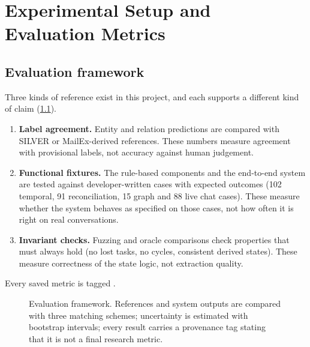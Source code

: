 \chapter{Experimental Setup and Evaluation Metrics}
\label{ch:evalsetup}

\section{Evaluation framework}
Three kinds of reference exist in this project, and each supports a different kind of claim (\cref{fig:evalframework}).
\begin{enumerate}
  \item \textbf{Label agreement.} Entity and relation predictions are compared with SILVER or MailEx-derived references. These numbers measure agreement with provisional labels, not accuracy against human judgement.
  \item \textbf{Functional fixtures.} The rule-based components and the end-to-end system are tested against developer-written cases with expected outcomes (102 temporal, 91 reconciliation, 15 graph and 88 live chat cases). These measure whether the system behaves as specified on those cases, not how often it is right on real conversations.
  \item \textbf{Invariant checks.} Fuzzing and oracle comparisons check properties that must always hold (no lost tasks, no cycles, consistent derived states). These measure correctness of the state logic, not extraction quality.
\end{enumerate}
Every saved metric is tagged .

\begin{figure}[t]
\centering
{}
\caption[Evaluation framework]{Evaluation framework. References and system outputs are compared with three matching schemes; uncertainty is estimated with bootstrap intervals; every result carries a provenance tag stating that it is not a final research metric.}
\label{fig:evalframework}
\end{figure}

